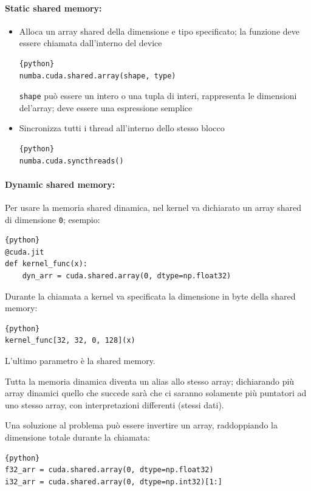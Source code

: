 \paragraph{Static shared memory:}
\begin{itemize}
	\item Alloca un array shared della dimensione e tipo specificato; la funzione deve essere chiamata dall'interno del device
	\begin{lstlisting}{python}
numba.cuda.shared.array(shape, type)
	\end{lstlisting}
	\texttt{shape} può essere un intero o una tupla di interi, rappresenta le dimensioni del'array; deve essere una espressione semplice
	
	\item Sincronizza tutti i thread all'interno dello stesso blocco
	\begin{lstlisting}{python}
numba.cuda.syncthreads()
	\end{lstlisting}
\end{itemize} 

\paragraph{Dynamic shared memory:} Per usare la memoria shared dinamica, nel kernel va dichiarato un array shared di dimensione \texttt{0}; esempio:
\begin{lstlisting}{python}
@cuda.jit
def kernel_func(x):
    dyn_arr = cuda.shared.array(0, dtype=np.float32)
\end{lstlisting}

Durante la chiamata a kernel va specificata la dimensione in byte della shared memory:
\begin{lstlisting}{python}
kernel_func[32, 32, 0, 128](x)
\end{lstlisting}
L'ultimo parametro è la shared memory.

Tutta la memoria dinamica diventa un alias allo stesso array; dichiarando più array dinamici quello che succede sarà che ci saranno solamente più puntatori ad uno stesso array, con interpretazioni differenti (stessi dati).

Una soluzione al problema può essere invertire un array, raddoppiando la dimensione totale durante la chiamata:
\begin{lstlisting}{python}
f32_arr = cuda.shared.array(0, dtype=np.float32)
i32_arr = cuda.shared.array(0, dtype=np.int32)[1:]
\end{lstlisting}

